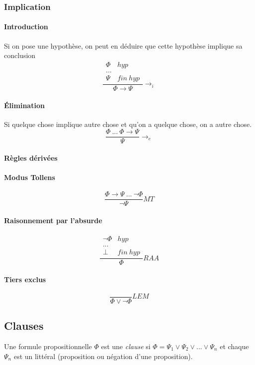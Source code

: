 \documentclass[a4paper]{article}
\begin{document}
  \subsubsection{Implication}
  \paragraph{Introduction} Si on pose une hypothèse, on peut en déduire que cette
  hypothèse implique sa conclusion
  $$ \frac{\begin{matrix} \Phi & hyp\\
     ... & \\
     \Psi & fin~hyp\end{matrix}}{\Phi \rightarrow \Psi}\rightarrow_{i} $$

  \paragraph{\'Elimination} Si quelque chose implique autre chose et qu'on a
  quelque chose, on a autre chose.
  $$ \frac{\Phi ~...~ \Phi \rightarrow \Psi}{\Psi}\rightarrow_{e} $$

  \paragraph{Règles dérivées}
  \paragraph{Modus Tollens}
  $$ \frac{\Phi \rightarrow \Psi ~...~ \lnot\Phi}{\lnot\Psi} MT $$

  \paragraph{Raisonnement par l'absurde}
  $$ \frac{\begin{matrix} \lnot \Phi & hyp\\
     ... & \\
     \bot & fin ~ hyp\end{matrix}}{\Phi}RAA $$

  \paragraph{Tiers exclus}
  $$\frac{}{\Phi \lor \lnot\Phi}LEM$$
  
  \subsection{Clauses}
  Une formule propositionnelle $\Phi$ est une \emph{clause} si $\Phi = \Psi_1 \vee \Psi_2 \vee ... \vee \Psi_n$ et chaque $\Psi_n$ est un littéral (proposition ou négation d'une proposition).
\end{document}
